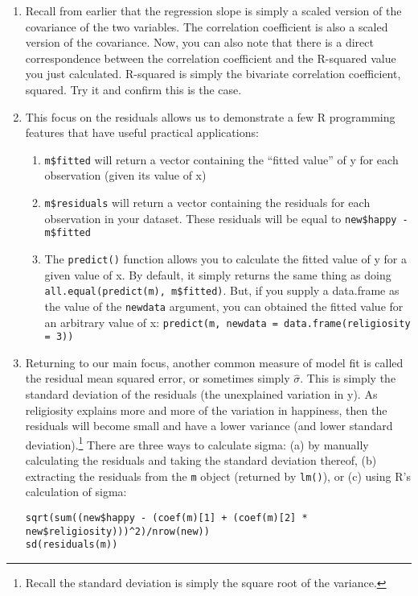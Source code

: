 \documentclass[a4paper,12pt]{article}
\begin{document}
\begin{enumerate}
\item Recall from earlier that the regression slope is simply a scaled version of the covariance of the two variables. The correlation coefficient is also a scaled version of the covariance. Now, you can also note that there is a direct correspondence between the correlation coefficient and the R-squared value you just calculated. R-squared is simply the bivariate correlation coefficient, squared. Try it and confirm this is the case.

\item This focus on the residuals allows us to demonstrate a few R programming features that have useful practical applications:

\begin{enumerate}
\item \texttt{m\$fitted} will return a vector containing the ``fitted value'' of y for each observation (given its value of x)
\item \texttt{m\$residuals} will return a vector containing the residuals for each observation in your dataset. These residuals will be equal to \texttt{new\$happy - m\$fitted}
\item The \texttt{predict()} function allows you to calculate the fitted value of y for a given value of x. By default, it simply returns the same thing as doing \texttt{all.equal(predict(m), m\$fitted)}. But, if you supply a data.frame as the value of the \texttt{newdata} argument, you can obtained the fitted value for an arbitrary value of x: \texttt{predict(m, newdata = data.frame(religiosity = 3))}
\end{enumerate}

\item Returning to our main focus, another common measure of model fit is called the residual mean squared error, or sometimes simply $\hat{\sigma}$. This is simply the standard deviation of the residuals (the unexplained variation in y). As religiosity explains more and more of the variation in happiness, then the residuals will become small and have a lower variance (and lower standard deviation).\footnote{Recall the standard deviation is simply the square root of the variance.} There are three ways to calculate sigma: (a) by manually calculating the residuals and taking the standard deviation thereof, (b) extracting the residuals from the \texttt{m} object (returned by \texttt{lm()}), or (c) using R's calculation of sigma:

\begin{verbatim}
sqrt(sum((new$happy - (coef(m)[1] + (coef(m)[2] * new$religiosity)))^2)/nrow(new))
sd(residuals(m))
\end{verbatim}


\end{enumerate}
\end{document}
